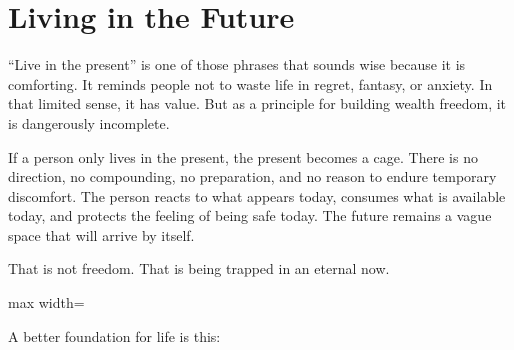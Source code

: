 \chapter{Living in the Future}

``Live in the present'' is one of those phrases that sounds wise because it is comforting. It reminds people not to waste life in regret, fantasy, or anxiety. In that limited sense, it has value. But as a principle for building wealth freedom, it is dangerously incomplete.

If a person only lives in the present, the present becomes a cage. There is no direction, no compounding, no preparation, and no reason to endure temporary discomfort. The person reacts to what appears today, consumes what is available today, and protects the feeling of being safe today. The future remains a vague space that will arrive by itself.

That is not freedom. That is being trapped in an eternal now.

\begin{center}
\begin{adjustbox}{max width=\linewidth}
\end{adjustbox}
\end{center}

A better foundation for life is this:

